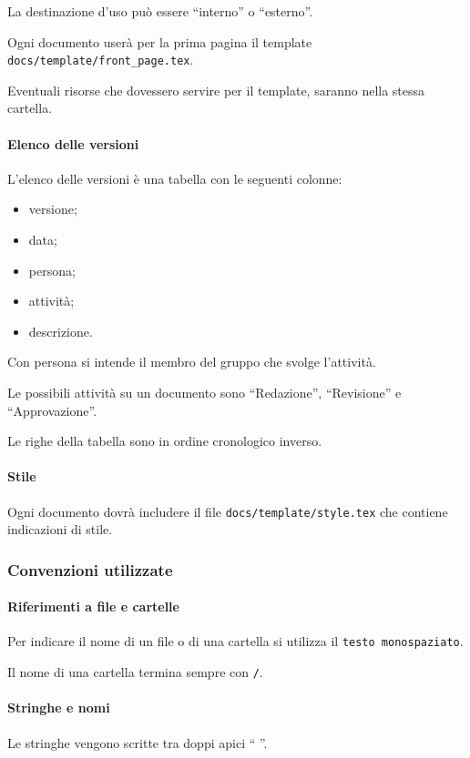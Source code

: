 \documentclass[a4paper, 12pt]{article}
\begin{document}
La destinazione d'uso può essere ``interno'' o ``esterno''.

Ogni documento userà per la prima pagina il template \texttt{docs/template/front\_page.tex}.

Eventuali risorse che dovessero servire per il template, saranno nella stessa cartella.

\paragraph{Elenco delle versioni}
L'elenco delle versioni è una tabella con le seguenti colonne:
\begin{itemize}
\item versione;
\item data;
\item persona;
\item attività;
\item descrizione.
\end{itemize}

Con persona si intende il membro del gruppo che svolge l'attività.

Le possibili attività su un documento sono ``Redazione'', ``Revisione'' e ``Approvazione''.

Le righe della tabella sono in ordine cronologico inverso.

\paragraph{Stile}
Ogni documento dovrà includere il file \texttt{docs/template/style.tex} che contiene indicazioni di stile.



\subsubsection{Convenzioni utilizzate}
\paragraph{Riferimenti a file e cartelle}
Per indicare il nome di un file o di una cartella si utilizza il  \texttt{testo monospaziato}.

Il nome di una cartella termina sempre con \texttt{/}.

\paragraph{Stringhe e nomi}
Le stringhe vengono scritte tra doppi apici `` ''.
\end{document}
